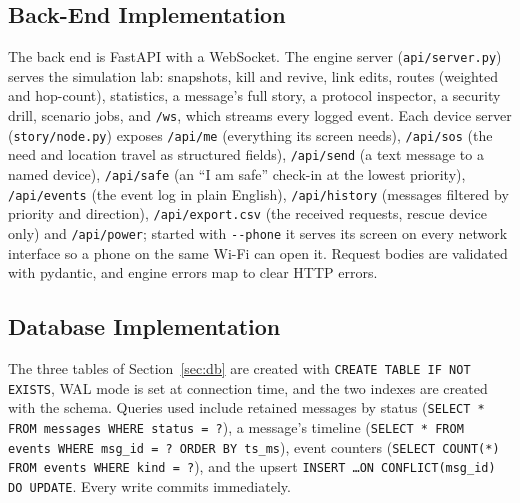 \subsection{Back-End Implementation}
The back end is FastAPI with a WebSocket. The engine server (\texttt{api/server.py}) serves the simulation lab: snapshots, kill and revive, link edits, routes (weighted and hop-count), statistics, a message's full story, a protocol inspector, a security drill, scenario jobs, and \texttt{/ws}, which streams every logged event. Each device server (\texttt{story/node.py}) exposes \texttt{/api/me} (everything its screen needs), \texttt{/api/sos} (the need and location travel as structured fields), \texttt{/api/send} (a text message to a named device), \texttt{/api/safe} (an ``I am safe'' check-in at the lowest priority), \texttt{/api/events} (the event log in plain English), \texttt{/api/history} (messages filtered by priority and direction), \texttt{/api/export.csv} (the received requests, rescue device only) and \texttt{/api/power}; started with \texttt{-{}-phone} it serves its screen on every network interface so a phone on the same Wi-Fi can open it. Request bodies are validated with pydantic, and engine errors map to clear HTTP errors.

\subsection{Database Implementation}
The three tables of Section~\ref{sec:db} are created with \texttt{CREATE TABLE IF NOT EXISTS}, WAL mode is set at connection time, and the two indexes are created with the schema. Queries used include retained messages by status (\texttt{SELECT * FROM messages WHERE status = ?}), a message's timeline (\texttt{SELECT * FROM events WHERE msg\_id = ? ORDER BY ts\_ms}), event counters (\texttt{SELECT COUNT(*) FROM events WHERE kind = ?}), and the upsert \texttt{INSERT \ldots ON CONFLICT(msg\_id) DO UPDATE}. Every write commits immediately.

